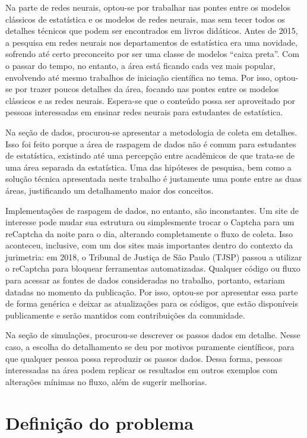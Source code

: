 \documentclass[12pt,twoside,brazilian]{book}
\begin{document}
Na parte de redes neurais, optou-se por trabalhar nas pontes entre os
modelos clássicos de estatística e os modelos de redes neurais, mas sem
tecer todos os detalhes técnicos que podem ser encontrados em livros
didáticos. Antes de 2015, a pesquisa em redes neurais nos departamentos
de estatística era uma novidade, sofrendo até certo preconceito por ser
uma classe de modelos ``caixa preta''. Com o passar do tempo, no
entanto, a área está ficando cada vez mais popular, envolvendo até mesmo
trabalhos de iniciação científica no tema. Por isso, optou-se por trazer
poucos detalhes da área, focando nas pontes entre os modelos clássicos e
as redes neurais. Espera-se que o conteúdo possa ser aproveitado por
pessoas interessadas em ensinar redes neurais para estudantes de
estatística.

Na seção de dados, procurou-se apresentar a metodologia de coleta em
detalhes. Isso foi feito porque a área de raspagem de dados não é comum
para estudantes de estatística, existindo até uma percepção entre
acadêmicos de que trata-se de uma área separada da estatística. Uma das
hipóteses de pesquisa, bem como a solução técnica apresentada neste
trabalho é justamente uma ponte entre as duas áreas, justificando um
detalhamento maior dos conceitos.

Implementações de raspagem de dados, no entanto, são inconstantes. Um
site de interesse pode mudar sua estrutura ou simplesmente trocar o
Captcha para um reCaptcha da noite para o dia, alterando completamente o
fluxo de coleta. Isso aconteceu, inclusive, com um dos sites mais
importantes dentro do contexto da jurimetria: em 2018, o Tribunal de
Justiça de São Paulo (TJSP) passou a utilizar o reCaptcha para bloquear
ferramentas automatizadas. Qualquer código ou fluxo para acessar as
fontes de dados consideradas no trabalho, portanto, estariam datadas no
momento da publicação. Por isso, optou-se por apresentar essa parte de
forma genérica e deixar as atualizações para os códigos, que estão
disponíveis publicamente e serão mantidos com contribuições da
comunidade.

Na seção de simulações, procurou-se descrever os passos dados em
detalhe. Nesse caso, a escolha do detalhamento se deu por motivos
puramente científicos, para que qualquer pessoa possa reproduzir os
passos dados. Dessa forma, pessoas interessadas na área podem replicar
os resultados em outros exemplos com alterações mínimas no fluxo, além
de sugerir melhorias.

\hypertarget{definiuxe7uxe3o-do-problema}{%
\section{Definição do problema}\label{definiuxe7uxe3o-do-problema}}
\end{document}
